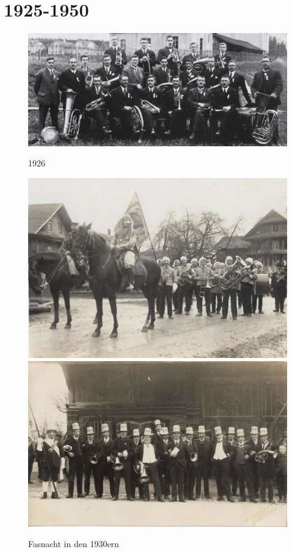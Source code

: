 \documentclass[openany]{book}
\begin{document}
\section{1925-1950}
\begin{figure}[ht]
    \centering
    \includegraphics{./chap/1925-1950/MGH-1926.jpg}
    \label{fig:mgh-1926}
    \caption{1926}
\end{figure}

\begin{figure}[ht]
    \centerline{
        \includegraphics{./chap/1925-1950/Fasnacht-1930er.jpg}
        \includegraphics{./chap/1925-1950/Fasnacht-vor-Kreuz-Scheune-1930er.jpg}
    }
    \label{fig:mgh-fasnacht-1930}
    \caption{Fasnacht in den 1930ern}
\end{figure}
\end{document}
